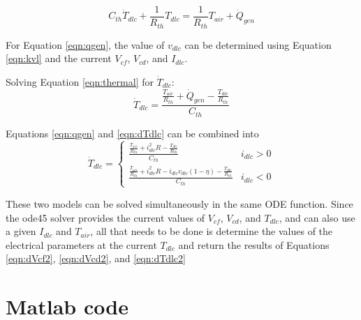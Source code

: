 \documentclass[fleqn]{article}
\begin{document}
\begin{equation}
C_{th} \dot{T}_{dlc} + \frac{1}{R_{th}} T_{dlc} = \frac{1}{R_{th}} T_{air} + \dot{Q}_{gen}
\label{eqn:thermal}
\end{equation}

For Equation \ref{eqn:qgen}, the value of $v_{dlc}$ can be determined using Equation \ref{eqn:kvl} and the current $V_{cf}$, $V_{cd}$, and $I_{dlc}$.

Solving Equation \ref{eqn:thermal} for $\dot{T}_{dlc}$:
\begin{equation}
\dot{T}_{dlc} = \frac{\frac{T_{air}}{R_{th}} + \dot{Q}_{gen} - \frac{T_{dlc}}{R_{th}}}{C_{th}}
\label{eqn:dTdlc}
\end{equation}

Equations \ref{eqn:qgen} and \ref{eqn:dTdlc} can be combined into
\begin{equation}
\dot{T}_{dlc} = 
\begin{cases}
\frac{\frac{T_{air}}{R_{th}} + i_{dlc}^2 R - \frac{T_{dlc}}{R_{th}}}{C_{th}} & i_{dlc} > 0 \\
\frac{\frac{T_{air}}{R_{th}} + i_{dlc}^2 R - i_{dlc} v_{dlc} \left(1 - \eta\right) - \frac{T_{dlc}}{R_{th}}}{C_{th}} & i_{dlc} < 0
\end{cases}
\label{eqn:dTdlc2}
\end{equation}

These two models can be solved simultaneously in the same ODE function. Since the ode45 solver provides the current values of $V_{cf}$, $V_{cd}$, and $T_{dlc}$, and can also use a given $I_{dlc}$ and $T_{air}$, all that needs to be done is determine the values of the electrical parameters at the current $T_{dlc}$ and return the results of Equations \ref{eqn:dVcf2}, \ref{eqn:dVcd2}, and \ref{eqn:dTdlc2}

\section{Matlab code}
\end{document}
